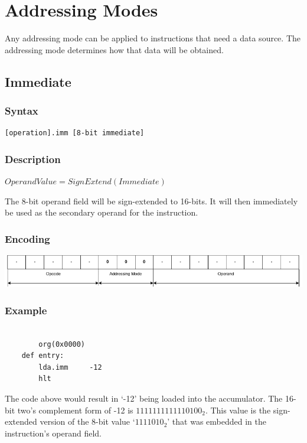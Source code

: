 \section{Addressing Modes}\label{subsec:addressing-modes}
\par Any addressing mode can be applied to instructions that need a data source.
The addressing mode determines how that data will be obtained.

\subsection{Immediate}\label{subsec:immediate-(imm)}
\subsubsection{Syntax}
\begin{verbatim}[operation].imm [8-bit immediate]\end{verbatim}

\subsubsection{Description}
$OperandValue = SignExtend(Immediate)$
\par The 8-bit operand field will be sign-extended to 16-bits.
It will then immediately be used as the secondary operand for the instruction.

\subsubsection{Encoding}
\begin{center}
    \includegraphics[scale=0.40]{img/Andromeda-IMM.drawio}
\end{center}

\subsubsection{Example}
\begin{verbatim}

        org(0x0000)
    def entry:
        lda.imm     -12
        hlt

\end{verbatim}
The code above would result in `-12' being loaded into the accumulator.
The 16-bit two's complement form of -12 is $1111111111110100_{2}$.
This value is the sign-extended version of the 8-bit value `$1111010_{2}$' that was embedded in the instruction's operand field.
\pagebreak

